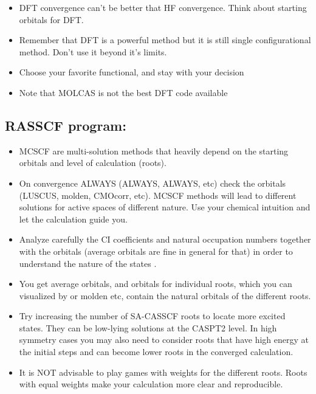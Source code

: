 \begin{itemize}
\item DFT convergence can't be better that HF convergence. Think about starting
orbitals for DFT.
\item Remember that DFT is a powerful method but 
it is still single configurational method. Don't use it beyond 
it's limits.
\item Choose your favorite functional, and stay with your decision
\item Note that MOLCAS is not the best DFT code available
\end{itemize}


\subsection{RASSCF program:}
\begin{itemize}
\item  MCSCF are multi-solution methods that heavily depend on 
 the starting orbitals and 
level of calculation (roots). 
\item On convergence ALWAYS (ALWAYS, ALWAYS, etc) check the orbitals 
(LUSCUS, molden, CMOcorr, etc). MCSCF methods will lead to different solutions 
for active spaces of 
different nature. Use your chemical intuition and 
let the calculation guide you. 
\item Analyze carefully the CI coefficients and natural occupation 
numbers together with 
the orbitals (average orbitals are fine in general for that) 
in order to understand the 
nature of the states .
\end{itemize}


\begin{itemize}
\item You get average orbitals, and orbitals for individual roots, which 
you can visualized by  or molden
etc, contain the natural orbitals of the different roots. 
\item Try increasing the number of SA-CASSCF roots to locate more excited states. They can 
be low-lying solutions at the CASPT2 level. In high symmetry cases you may also need 
to consider roots that have high energy at the initial steps and can become lower roots in 
the converged calculation. 
\item It is NOT advisable to play games with weights for the different roots. Roots with equal 
weights make your calculation more clear and reproducible. 
\end{itemize}

